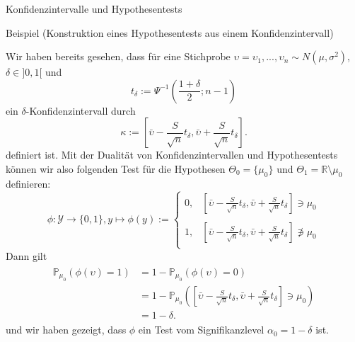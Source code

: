 \documentclass[
  8pt,
  ignorenonframetext,
]{beamer}
\newcommand{\niton}{\not\owns}
\newcommand{\ups} {\upsilon}
\begin{document}
\begin{frame}{Konfidenzintervalle und Hypothesentests}
\protect\hypertarget{konfidenzintervalle-und-hypothesentests-1}{}
\small

Beispiel (Konstruktion eines Hypothesentests aus einem
Konfidenzintervall)

\footnotesize

Wir haben bereits gesehen, dass für eine Stichprobe
\(\ups = \ups_1,...,\ups_n \sim N(\mu,\sigma^2)\), \(\delta \in ]0,1[\)
und \begin{equation}
t_\delta := \Psi^{-1}\left(\frac{1 + \delta}{2}; n-1 \right)
\end{equation} ein \(\delta\)-Konfidenzintervall durch \begin{equation}
\kappa :=
\left[\bar{\ups} - \frac{S}{\sqrt{n}}t_\delta,\bar{\ups} + \frac{S}{\sqrt{n}}t_\delta\right].
\end{equation} definiert ist. Mit der Dualität von Konfidenzintervallen
und Hypothesentests können wir also folgenden Test für die Hypothesen
\(\Theta_0 = \{\mu_0\}\) und \(\Theta_1 = \mathbb{R} \setminus \mu_0\)
definieren: \begin{equation}
\phi : \mathcal{Y} \to \{0,1\},
y \mapsto \phi(y)
:=
\begin{cases}
0, & \left[\bar{\ups} - \frac{S}{\sqrt{n}}t_\delta,\bar{\ups} + \frac{S}{\sqrt{n}}t_\delta\right]
           \ni \mu_0
          \\ \\
1, &\left[\bar{\ups} - \frac{S}{\sqrt{n}}t_\delta,\bar{\ups} + \frac{S}{\sqrt{n}}t_\delta\right]
          \niton \mu_0
          \\
\end{cases}
\end{equation} Dann gilt \begin{align}
\begin{split}
\mathbb{P}_{\mu_0}\left(\phi(\ups) = 1 \right)
& = 1 - \mathbb{P}_{\mu_0}\left(\phi(\ups) = 0 \right) \\
& = 1 - \mathbb{P}_{\mu_0}\left(
            \left[\bar{\ups} - \frac{S}{\sqrt{n}}t_\delta,
                  \bar{\ups} + \frac{S}{\sqrt{n}}t_\delta\right]
            \ni \mu_0\right) \\
& = 1 - \delta.
\end{split}
\end{align} und wir haben gezeigt, dass \(\phi\) ein Test vom
Signifikanzlevel \(\alpha_0 = 1 -\delta\) ist.
\end{frame}
\end{document}
